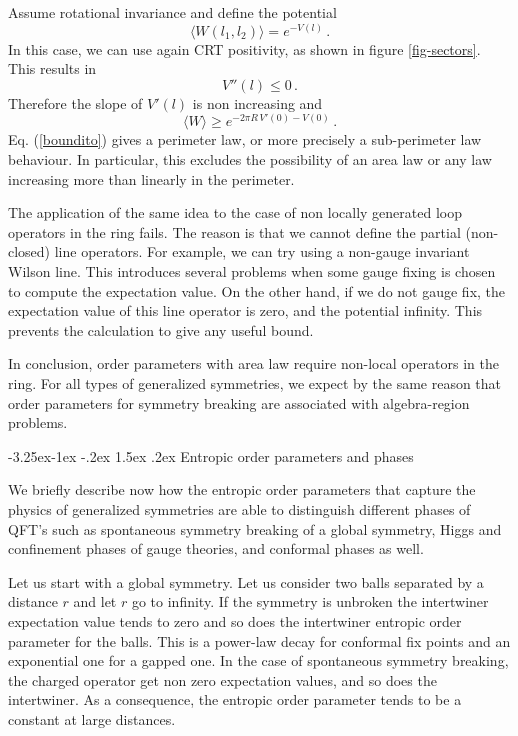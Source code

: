 \documentclass[11pt,a4paper]{article}
\makeatletter
\renewcommand\subsection{\@startsection{subsection}{2}{\z@}%
                                   {-3.25ex\@plus -1ex \@minus -.2ex}%
                                     {1.5ex \@plus .2ex}%
                                     {\normalfont\bfseries}}
\numberwithin{equation}{section}
\newcommand{\be}{\begin{equation}}
\newcommand{\ee}{\end{equation}}
\makeatother
\begin{document}
Assume rotational invariance and define the potential
\be
\langle W(l_1,l_2)\rangle =e^{-V(l)}\,.\label{hh}
\ee
 In this case, we can use again CRT positivity, as shown in figure \ref{fig-sectors}. This results in
\be 
 V''(l)\le 0\,.
\ee   
Therefore the slope of $V'(l)$ is non increasing and
\be
\langle W \rangle \ge e^{-2 \pi R \,V'(0)-V(0)} \,. \label{boundito}
\ee
 Eq. (\ref{boundito}) gives a perimeter law, or more precisely a sub-perimeter law behaviour. In particular, this excludes the possibility of an area law or any law increasing more than linearly in the perimeter.   

The application of the same idea to the case of non locally generated loop operators in the ring fails. The reason is that we cannot define the partial (non-closed) line operators. For example, we can try using a non-gauge invariant Wilson line.  This introduces several problems when some gauge fixing is chosen to compute the expectation value. On the other hand, if we do not gauge fix, the expectation value of this line operator is zero, and the potential infinity. This prevents the calculation to give any useful bound.   

In conclusion, order parameters with area law require non-local operators in the ring. For all types of generalized symmetries, we expect by the same reason that order parameters for symmetry breaking are associated with algebra-region problems.  





\subsection{Entropic order parameters and phases}

We briefly describe now how the entropic order parameters that capture the physics of generalized symmetries are able to distinguish different phases of QFT's such as spontaneous symmetry breaking of a global symmetry, Higgs and confinement phases of gauge theories, and conformal phases as well. 


Let us start with a global symmetry. Let us consider two balls separated by a distance $r$ and let $r$ go to infinity. If the symmetry is unbroken the intertwiner expectation value tends to zero and so does the intertwiner entropic order parameter for the balls. This is a power-law decay for conformal fix points and an exponential one for a gapped one. 
In the case of spontaneous symmetry breaking, the charged operator get non zero expectation values, and so does the intertwiner.  As a consequence, the entropic order parameter tends to be a constant at large distances.
\end{document}
